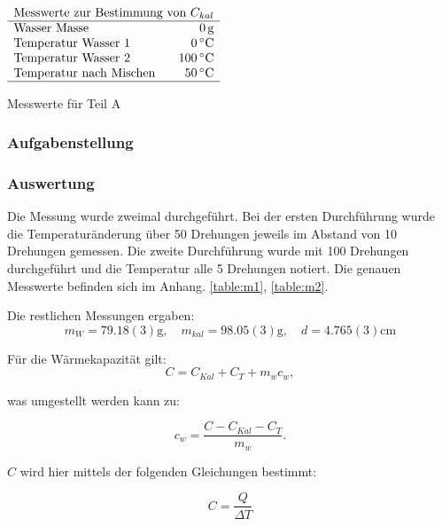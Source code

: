 \documentclass[11pt,a4paper]{article}
\begin{document}
\begin{table}
\centering
$\begin{array}{lr}
	\multicolumn{2}{l}{\textrm{Messwerte zur Bestimmung von }C_{kal}}\\
	\hline
	\textrm{Wasser Masse} & 0\,\textrm{g} \\
	\textrm{Temperatur Wasser 1} & 0\,\celsius \\
	\textrm{Temperatur Wasser 2} & 100\,\celsius \\
	\textrm{Temperatur nach Mischen} & 50\,\celsius\\
	\hline
\end{array}$
\renewcommand\thetable{T1}
\caption{Messwerte für Teil A}
\label{tab:1}
\end{table}


\subsubsection{Aufgabenstellung}


\subsubsection{Auswertung}

Die Messung wurde zweimal durchgef\"uhrt. Bei der ersten Durchf\"uhrung wurde die Temperatur\"anderung \"uber 50 Drehungen jeweils im Abstand von 10 Drehungen gemessen. Die zweite Durchf\"uhrung wurde mit 100 Drehungen durchgef\"uhrt und die Temperatur alle 5 Drehungen notiert. Die genauen Messwerte befinden sich im Anhang. \ref{table:m1}, \ref{table:m2}.

Die restlichen Messungen ergaben: $$m_W = 79.18(3)\textrm{g}, \quad m_{kal} = 98.05(3)\textrm{g}, \quad d = 4.765(3)\textrm{cm}$$

F\"ur die W\"armekapazit\"at gilt:\\

\begin{equation}
C=C_{Kal}+C_T+m_wc_w,\label{eq1}
\end{equation}

was umgestellt werden kann zu:

\begin{equation}
c_w=\frac{C-C_{Kal}-C_T}{m_w}.\label{eq2}
\end{equation}

$C$ wird hier mittels der folgenden Gleichungen bestimmt:

\begin{equation}
C=\frac{Q}{\Delta T}
\end{equation}
\end{document}

